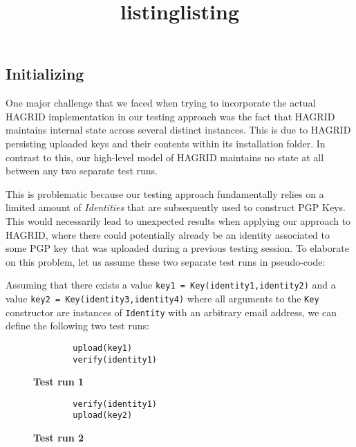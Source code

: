 \subsection{Initializing}
One major challenge that we faced when trying to incorporate the actual HAGRID implementation in our testing approach was the fact that HAGRID maintains internal state across several distinct instances. This is due to HAGRID persisting uploaded keys and their contents within its installation folder. 
In contrast to this, our high-level model of HAGRID maintains no state at all between any two separate test runs.

This is problematic because our testing approach fundamentally relies on a limited amount of \emph{Identities} that are subsequently used to construct PGP Keys. This would necessarily lead to unexpected results when applying our approach to HAGRID, where there could potentially already be an identity associated to some PGP key that was uploaded during a previous testing session. 
To elaborate on this problem, let us assume these two separate test runs in pseudo-code:

Assuming that there exists a value \texttt{key1 = Key(identity1,identity2)} and a value \texttt{key2 = Key(identity3,identity4)}
 where all arguments to the \texttt{Key} constructor are instances of \texttt{Identity} with an arbitrary email address, we can define the following two test runs: 
\begin{figure}[!h]
    \begin{minipage}{0.5\textwidth}
        \centering
        \begin{verbatim}
        upload(key1)
        verify(identity1)
        \end{verbatim}
        \title{listing}{\textbf{Test run 1}}
    \end{minipage}
    \begin{minipage}{0.5\textwidth}
        \centering
        \begin{verbatim}
        verify(identity1)
        upload(key2)
        \end{verbatim}
        \title{listing}{\textbf{Test run 2}}
    \end{minipage}
\end{figure}

